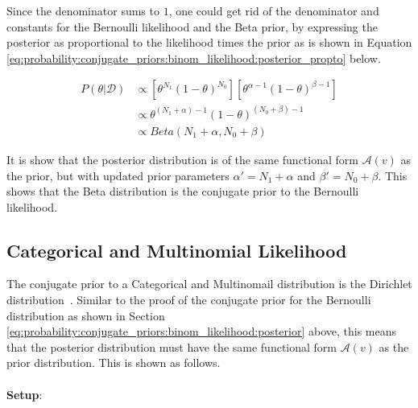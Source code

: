 Since the denominator sums to $1$, one could get rid of the denominator and constants for the Bernoulli likelihood and the Beta prior, by expressing the posterior as proportional to the likelihood times the prior as is shown in Equation \ref{eq:probability:conjugate_priors:binom_likelihood:posterior_propto} below.

\begin{equation}
      \label{eq:probability:conjugate_priors:binom_likelihood:posterior_propto}
      \begin{split}
            P(\theta | \mathcal{D}) &\propto \left[\theta^{N_{1}}(1-\theta)^{N_{0}}\right] \left[\theta^{\alpha - 1} (1 - \theta)^{\beta - 1}\right] \\
            &\propto \theta^{(N_{1} + \alpha) - 1}(1-\theta)^{(N_{0} + \beta) - 1} \\
            &\propto Beta(N_{1} + \alpha, N_{0} + \beta)
      \end{split}
\end{equation}

It is show that the posterior distribution is of the same functional form $\mathcal{A}(v)$ as the prior, but with updated prior parameters $\alpha' = N_{1} + \alpha$ and $\beta' = N_{0} + \beta$. This shows that the Beta distribution is the conjugate prior to the Bernoulli likelihood.


\subsection{Categorical and Multinomial Likelihood}
\label{sec:probability:conjugate_priors:cat_mult_likelihood}

The conjugate prior to a Categorical and Multinomail distribution is the Dirichlet distribution~\cite{ref:wackerly:2014}. Similar to the proof of the conjugate prior for the Bernoulli distribution as shown in Section \ref{eq:probability:conjugate_priors:binom_likelihood:posterior} above, this means that the posterior distribution must have the same functional form $\mathcal{A}(v)$ as the prior distribution. This is shown as follows. \\\\
\textbf{Setup}:

